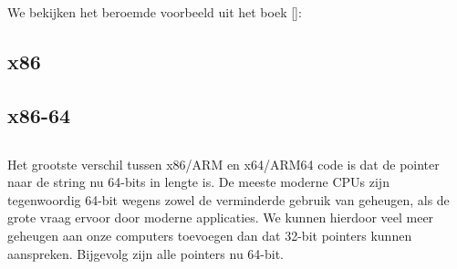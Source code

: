 \mysection{\HelloWorldSectionName}
\label{sec:helloworld}

We bekijken het beroemde voorbeeld uit het boek [\KRBook]:



\subsection{x86}




\subsection{x86-64}






\subsection{\Conclusion{}}

Het grootste verschil tussen x86/ARM en x64/ARM64 code is dat de pointer naar de string nu 64-bits in lengte is.
De meeste moderne \ac{CPU}s zijn tegenwoordig 64-bit wegens zowel de verminderde gebruik van geheugen, als de grote vraag ervoor door moderne applicaties.
We kunnen hierdoor veel meer geheugen aan onze computers toevoegen dan dat 32-bit pointers kunnen aanspreken.
Bijgevolg zijn alle pointers nu 64-bit.


